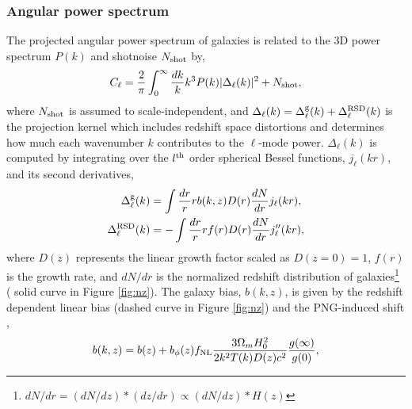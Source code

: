 \subsubsection{Angular power spectrum}
The projected angular power spectrum of galaxies is related to the 3D power spectrum $P(k)$  \citep[see, e.g.,][]{Padmanabhan2007} and shotnoise $N_{\rm shot}$ by,
\begin{equation}\label{eq:cell}
    C_{\ell} = \frac{2}{\pi}\int_{0}^{\infty}\frac{dk}{k}k^{3}P(k)|\Delta_{\ell}(k)|^{2} + N_{\rm shot},
\end{equation}
where $N_{\rm shot}$ is assumed to  scale-independent, and $\Delta_{\ell}(k) = \Delta^{\rm g}_{\ell}(k) + \Delta^{\rm RSD}_{\ell}(k)$ is the projection kernel which includes redshift space distortions and determines how much each wavenumber $k$ contributes to the $\ell$-mode power. $\Delta_{\ell}(k)$ is computed by integrating over the $l^{\rm th}$ order spherical Bessel functions, $ j_{\ell}(kr)$, and its second derivatives,
\begin{align}
    \Delta^{\rm g}_{\ell}(k) &= \int \frac{dr}{r} r b(k, z) D(r) \frac{dN}{dr} j_{\ell}(kr),\\
    \Delta^{\rm RSD}_{\ell}(k) &= - \int \frac{dr}{r} r f(r) D(r) \frac{dN}{dr} j^{\prime\prime}_{\ell}(kr),
\end{align}
where $D(z)$ represents the linear growth factor scaled as $D(z=0)=1$, $f(r)$ is the growth rate, and $dN/dr$ is the normalized redshift distribution of galaxies\footnote{$dN/dr = (dN/dz)*(dz/dr) \propto (dN/dz)*H(z)$} ( solid curve in Figure \ref{fig:nz}). The galaxy bias, $b(k,z)$, is given by the redshift dependent linear bias (dashed curve in Figure \ref{fig:nz}) and the PNG-induced shift \citep{slosar2008constraints},
\begin{equation}
b(k, z) = b(z) + b_{\phi}(z) f_{\rm NL} \frac{3 \Omega_{m} H^{2}_{0}}{2 k^{2}T(k)D(z) c^{2}} \frac{g(\infty)}{g(0)},
\label{eq:scaledepbias}
\end{equation}
